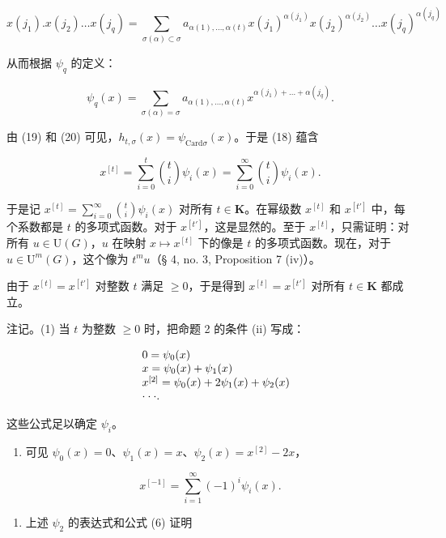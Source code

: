 \[
x (j _ {1}). x (j _ {2}) \dots x (j _ {q}) = \sum_ {\sigma (\alpha) \subset \sigma} a _ {\alpha (1), \dots , \alpha (t)} x (j _ {1}) ^ {\alpha (j _ {1})} x (j _ {2}) ^ {\alpha (j _ {2})} \dots x (j _ {q}) ^ {\alpha (j _ {q})}
\]

从而根据 \(\psi_q\) 的定义：

\[
\psi_ {q} (x) = \sum_ {\sigma (\alpha) = \sigma} a _ {\alpha (1), \dots , \alpha (t)} x ^ {\alpha (j _ {1}) + \dots + \alpha (j _ {q})}.\tag{20}
\]

由 (19) 和 (20) 可见，\(h_{t,\sigma}(x) = \psi_{\mathrm{Card}\sigma}(x)\)。于是 (18) 蕴含

\[
x ^ {[ t ]} = \sum_ {i = 0} ^ {t} \binom {t} {i} \psi_ {i} (x) = \sum_ {i = 0} ^ {\infty} \binom {t} {i} \psi_ {i} (x).
\]

于是记 \(x^{[t]} = \sum_{i=0}^{\infty} \binom{t}{i}\psi_i(x)\) 对所有 \(t\in\mathbf{K}\)。在幂级数 \(x^{[t]}\) 和 \(x^{[t']}\) 中，每个系数都是 \(t\) 的多项式函数。对于 \(x^{[t']}\)，这是显然的。至于 \(x^{[t]}\)，只需证明：对所有 \(u\in\mathrm{U}(G)\)，\(u\) 在映射 \(x\mapsto x^{[t]}\) 下的像是 \(t\) 的多项式函数。现在，对于 \(u\in\mathrm{U}^{m}(G)\)，这个像为 \(t^{m}u\)（§ 4, no. 3, Proposition 7 (iv)）。

由于 \(x^{[t]} = x^{[t']}\) 对整数 \(t\) 满足 \(\geqslant 0\)，于是得到 \(x^{[t]} = x^{[t']}\) 对所有 \(t \in \mathbf{K}\) 都成立。

注记。(1) 当 \(t\) 为整数 \(\geqslant 0\) 时，把命题 2 的条件 (ii) 写成：

\[
\begin{array}{r l} & 0 = \psi_ {0} (x) \\ & x = \psi_ {0} (x) + \psi_ {1} (x) \\ & x ^ {[ 2 ]} = \psi_ {0} (x) + 2 \psi_ {1} (x) + \psi_ {2} (x) \\ & \cdot \cdot \cdot . \end{array}
\]

这些公式足以确定 \(\psi_{i}\)。

\begin{enumerate}
\def\labelenumi{(\arabic{enumi})}
\setcounter{enumi}{1}
\tightlist
\item
  可见 \(\psi_0(x) = 0\)、\(\psi_1(x) = x\)、\(\psi_2(x) = x^{[2]} - 2x\)，
\end{enumerate}

\[
x ^ {[ - 1 ]} = \sum_ {i = 1} ^ {\infty} (- 1) ^ {i} \psi_ {i} (x).
\]

\begin{enumerate}
\def\labelenumi{(\arabic{enumi})}
\setcounter{enumi}{2}
\tightlist
\item
  上述 \(\psi_{2}\) 的表达式和公式 (6) 证明
\end{enumerate}


